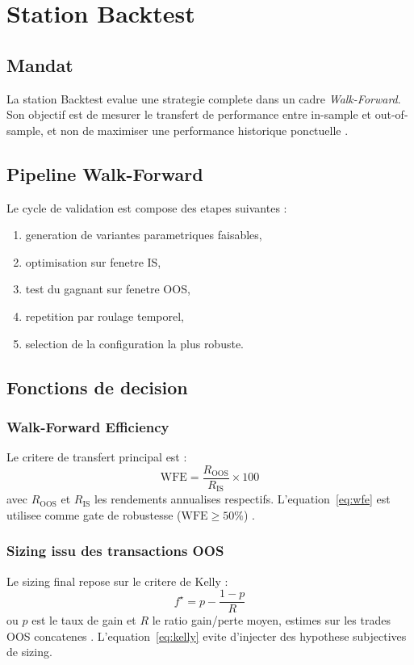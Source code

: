 \chapter{Station Backtest}

\section{Mandat}
La station Backtest evalue une strategie complete dans un cadre
\textit{Walk-Forward}. Son objectif est de mesurer le transfert de performance
entre in-sample et out-of-sample, et non de maximiser une performance historique
ponctuelle \cite{pardo2008}.

\section{Pipeline Walk-Forward}
Le cycle de validation est compose des etapes suivantes :
\begin{enumerate}
\item generation de variantes parametriques faisables,
\item optimisation sur fenetre IS,
\item test du gagnant sur fenetre OOS,
\item repetition par roulage temporel,
\item selection de la configuration la plus robuste.
\end{enumerate}

\section{Fonctions de decision}
\subsection{Walk-Forward Efficiency}
Le critere de transfert principal est :
\begin{equation}
\text{WFE} = \frac{R_{\mathrm{OOS}}}{R_{\mathrm{IS}}} \times 100
\label{eq:wfe}
\end{equation}
avec $R_{\mathrm{OOS}}$ et $R_{\mathrm{IS}}$ les rendements annualises respectifs.
L'equation~\ref{eq:wfe} est utilisee comme gate de robustesse (\(\text{WFE}\geq 50\%\))
\cite{pardo2008}.

\subsection{Sizing issu des transactions OOS}
Le sizing final repose sur le critere de Kelly :
\begin{equation}
f^\star = p - \frac{1-p}{R}
\label{eq:kelly}
\end{equation}
ou \(p\) est le taux de gain et \(R\) le ratio gain/perte moyen, estimes sur les
trades OOS concatenes \cite{kelly1956,thorp2006}. L'equation~\ref{eq:kelly}
evite d'injecter des hypothese subjectives de sizing.

